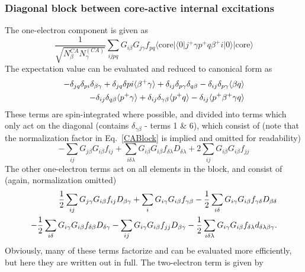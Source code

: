 \documentclass[a4paper,oneside,11pt]{article}
\numberwithin{equation}{section}
\newcommand{\DMETBra}{\langle \mathrm{core}|\langle 0|}
\newcommand{\DMETKet}{|0\rangle| \mathrm{core} \rangle}
\begin{document}
\subsubsection{Diagonal block between core-active internal excitations}
The one-electron component is given as 
\begin{equation}
\frac{1}{\sqrt{N^{CA}_{\beta} N^{(CA)}_{\gamma}}} \sum_{ijpq} G_{i \beta} G_{j \gamma} f_{pq} \DMETBra j^{+} \gamma p^{+} q \beta^{+} i \DMETKet     \label{CABlock}
\end{equation}
The expectation value can be evaluated and reduced to canonical form as
\begin{eqnarray}
-\delta_{jq}\delta_{pi}\delta_{\beta \gamma} + \delta_{jq}\delta{pi}\langle \beta^{+} \gamma \rangle + \delta_{ij} \delta_{p \gamma} \delta_{q \beta} - \delta_{ij} \delta_{p \gamma} \langle \beta q \rangle \\ \notag
- \delta_{ij} \delta_{q \beta} \langle p^{+} \gamma \rangle + \delta_{ij} \delta_{\gamma \beta} \langle p^{+} q \rangle - \delta_{ij} \langle p^{+} \beta^{+} \gamma q \rangle
\end{eqnarray}
These terms are spin-integrated where possible, and divided into terms which only act on the diagonal (contains $\delta_{\gamma \beta}$ - terms 1 \& 6), 
which consist of (note that the normalization factor in Eq.~\ref{CABlock} is implied and omitted for readability)
\begin{equation}
-\sum_{ij} G_{j \beta} G_{i \beta} f_{ij} + \sum_{i \delta \lambda} G_{i \beta} G_{i \beta} f_{\delta \lambda} D_{\delta \lambda} + 2 \sum_{ij} G_{i \beta} G_{i \beta} f_{jj}
\end{equation}
The other one-electron terms act on all elements in the block, and consist of (again, normalization omitted)
\begin{eqnarray}
\frac{1}{2} \sum_{ij} G_{j \gamma} G_{i \beta} f_{ij} D_{\beta \gamma} + \sum_{i} G_{i \gamma} G_{i \beta} f_{\gamma \beta} - \frac{1}{2} \sum_{i \delta} G_{i \gamma} G_{i \beta} f_{\gamma \delta} D_{\beta \delta}  \notag \\ 
- \frac{1}{2} \sum_{i \delta} G_{i \gamma} G_{i \beta} f_{\delta \beta} D_{\delta \gamma} - \sum_{ij} G_{i \gamma} G_{i \beta} f_{jj} D_{\beta \gamma} - \frac{1}{2} \sum_{i \delta \lambda} G_{i \gamma} G_{i \beta} f_{\delta \lambda} d_{\delta \lambda \beta \gamma} .
\end{eqnarray}
Obviously, many of these terms factorize and can be evaluated more efficiently, but here they are written out in full.
The two-electron term is given by
\end{document}
